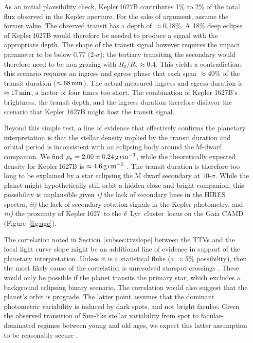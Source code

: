 \documentclass[12pt,modern,twocolumn,tighten,linenumbers]{aastex63}
\newcommand{\cn}{$\delta$\ Lyr\ cluster} %
\newcommand{\sn}{Kepler\,1627} %
\begin{document}

As an initial plausibility check, Kepler\,1627B contributes 1\% to 2\%
of the total flux observed in the Kepler aperture.  For the sake of
argument, assume the former value.  The observed transit has a depth
of $\approx$0.18\%.  A 18\% deep eclipse of Kepler\,1627B would
therefore be needed to produce a signal with the appropriate depth.
The shape of the transit signal however requires the impact parameter
to be below 0.77 (2-$\sigma$); the tertiary transiting the secondary
would therefore need to be non-grazing with $R_3/R_2 \approx 0.4$.
This yields a contradiction:  this scenario requires an ingress
and egress phase that each span $\approx$40\% of the transit duration
($\approx 68\,{\rm min}$).  The actual measured ingress and egress
duration is $\approx 17\,{\rm min}$, a factor of four times too
short.  The combination of Kepler 1627B's brightness, the transit
depth, and the ingress duration therefore disfavor the scenario that
Kepler 1627B might host the transit signal.  


Beyond this simple test, a line of evidence that
effectively confirms the planetary interpretation is that the stellar density
implied by the transit duration and orbital period is inconsistent
with an eclipsing body around the M-dwarf companion.  We find
$\rho_\star = 2.00 \pm 0.24\,{\rm g\,cm}^{-3}$, while the
theoretically expected density for Kepler\,1627B is $\approx 4.6\,{\rm
g\,cm}^{-3}$ \citep{baraffe_new_2015}.
The transit duration is therefore too long to be explained by a star
eclipsing the M dwarf secondary at $10$-$\sigma$.  While the planet
might hypothetically still orbit a hidden close and bright companion,
this possibility is implausible given {\it i)} the lack of secondary
lines in the HIRES spectra, {\it ii)} the lack of secondary
rotation signals in the Kepler photometry, and {\it iii)} the proximity
of \sn\ to the \cn\ locus on the Gaia CAMD (Figure~\ref{fig:age}).


The correlation noted in Section~\ref{subsec:ttvslope} between the
TTVs and the local light curve slope might be an additional line of evidence
in support of the planetary interpretation.  Unless it is a
statistical fluke (a $\approx$5\% possibility), then the most likely
cause of the correlation is unresolved starspot
crossings \citep{mazeh_time_2015}.  These would only be possible if the
planet transits the primary star, which excludes a background
eclipsing binary scenario.  The correlation would also suggest that the planet's
orbit is prograde.  The latter point assumes that the dominant
photometric variability is induced by dark spots, and not bright
faculae.  Given the observed transition of Sun-like stellar
variability from spot to faculae-dominated regimes between young and
old ages, we expect this latter assumption to be reasonably secure
\citep{shapiro_are_2016,montet_long-term_2017,reinhold_stellar_2020}.
\end{document}

